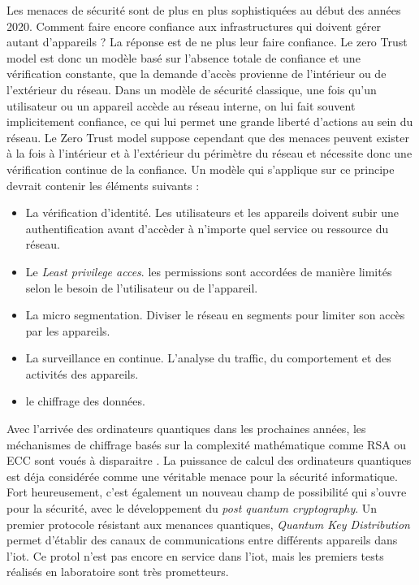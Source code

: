 Les menaces de sécurité sont de plus en plus sophistiquées au début des années 2020. Comment faire encore confiance aux infrastructures qui doivent gérer autant d'appareils ? La réponse est de ne plus leur faire confiance. Le zero Trust model est donc un modèle basé sur l'absence totale de confiance et une vérification constante, que la demande d'accès provienne de l'intérieur ou de l'extérieur du réseau. Dans un modèle de sécurité classique, une fois qu'un utilisateur ou un appareil accède au réseau interne, on lui fait souvent implicitement confiance, ce qui lui permet une grande liberté d'actions au sein du réseau. Le Zero Trust model suppose cependant que des menaces peuvent exister à la fois à l’intérieur et à l’extérieur du périmètre du réseau et nécessite donc une vérification continue de la confiance. Un modèle qui s'applique sur ce principe devrait contenir les éléments suivants\cite{zero1} :
\begin{itemize}
\item La vérification d'identité. Les utilisateurs et les appareils doivent subir une authentification avant d'accèder à n'importe quel service ou ressource du réseau.
\item Le \textit{Least privilege acces}. les permissions sont accordées de manière limités selon le besoin de l'utilisateur ou de l'appareil.
\item La micro segmentation. Diviser le réseau en segments pour limiter son accès par les appareils.
\item La surveillance en continue. L'analyse du traffic, du comportement et des activités des appareils.
\item le chiffrage des données.
\end{itemize}

\vspace{0.1cm}


Avec l'arrivée des ordinateurs quantiques dans les prochaines années, les méchanismes de chiffrage basés sur la complexité mathématique comme RSA ou ECC sont voués à disparaitre  \cite{quantumcrypto}. La puissance de calcul des ordinateurs quantiques est déja considérée comme une véritable menace pour la sécurité informatique. Fort heureusement, c'est également un nouveau champ de possibilité qui s'ouvre pour la sécurité, avec le développement du \textit{post quantum cryptography}. Un premier protocole résistant aux menances quantiques, \textit{Quantum Key Distribution} permet d'établir des canaux de communications entre différents appareils dans l'iot. Ce protol n'est pas encore en service dans l'iot, mais les premiers tests réalisés en laboratoire sont très prometteurs\cite{qinternet}.